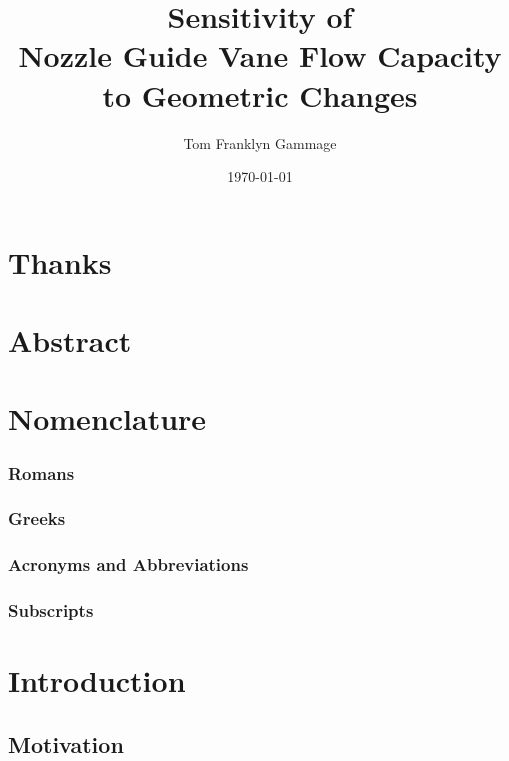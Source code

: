 \documentclass[a4paper, 11pt, oneside]{report}
\title{Sensitivity of\\Nozzle Guide Vane Flow Capacity\\to Geometric Changes}
\author{Tom Franklyn Gammage}
\date{\mydate\today}
\begin{document}
\maketitle

\chapter*{Thanks}

\chapter*{Abstract}

\tableofcontents
\listoffigures
\listoftables

\chapter*{Nomenclature}
\subsection*{Romans}
\subsection*{Greeks}
\subsection*{Acronyms and Abbreviations}
\subsection*{Subscripts}



\chapter{Introduction}



\section{Motivation}
\end{document}

